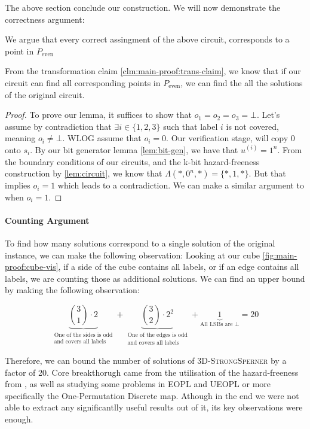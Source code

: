 The above section conclude our construction. We will now demonstrate the correctness argument:

\begin{lemma}
    We argue that every correct assingment of the above circuit, corresponds to a point in $P_{\text{even}}$
\end{lemma}
From the transformation claim \ref{clm:main-proof:trans-claim}, we know that if our circuit
can find all corresponding points in $P_{\text{even}}$, we can find the all the solutions of the original circuit.

\begin{proof}
    To prove our lemma, it suffices to show that $o_1 = o_2 = o_3 = \bot$. Let's assume by contradiction that
    $\exists i \in \{1,2,3\}$ such that label $i$ is not covered, meaning $o_i \neq \bot$.
    WLOG assume that $o_i = 0$. Our verification stage, will copy $0$ onto $s_i$. By our
    bit generator lemma \ref{lem:bit-gen}, we have that $u^{(i)} = 1^n$. From the boundary
    conditions of our circuits, and the k-bit hazard-freeness construction by
    \ref{lem:circuit}, we know that $\Lambda(*, 0^n, *) = \{*, 1,  *\}$. But that implies
    $o_i = 1$ which leads to a contradiction. We can make a similar argument to when $o_i = 1$.
\end{proof}

\paragraph*{Counting Argument}

To find how many solutions correspond to a single solution of the original instance,
we can make the following observation: Looking at our cube \ref{fig:main-proof:cube-vis},
if a side of the cube contains all labels, or if an edge contains all labels, we are counting
those as additional solutions. We can find an upper bound by making the following observation:

$$
\underbrace{\binom{3}{1} \cdot 2}_{\substack{\text{One of the sides is odd} \\ \text{and covers all labels}}}
+ \underbrace{\binom{3}{2} \cdot 2^2}_{\substack{\text{One of the edges is odd} \\ \text{and covers all labels}}}
+ \underbrace{1}_{\text{All LSBs are } \bot} = 20
$$

Therefore, we can bound the number of solutions of \textsc{3D-StrongSperner} by a factor of 20.
Core breakthorugh came from the utilisation of the hazard-freeness from \cite{ikenmeyer_complexity_2019},
as well as studying some problems in EOPL and UEOPL or more specifically the
One-Permutation Discrete map. Athough in the end we were not able to extract any significantlly
useful results out of it, its key observations were enough.


